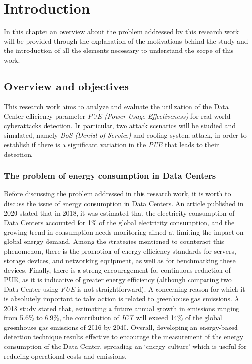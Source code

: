 \chapter{Introduction} \label{chapter:introduction}

\begin{citazione}
In this chapter an overview about the problem addressed by this research work will be provided through the explanation of the motivations behind the study and the introduction of all the elements necessary to understand the scope of this work.
\end{citazione}
\newpage


\section{Overview and objectives} 
This research work aims to analyze and evaluate the utilization of the Data Center efficiency parameter \emph{PUE (Power Usage Effectiveness)} for real world cyberattacks detection. In particular, two attack scenarios will be studied and simulated, namely \emph{DoS (Denial of Service)} and cooling system attack, in order to establish if there is a significant variation in the \emph{PUE} that leads to their detection. 

\subsection{The problem of energy consumption in Data Centers}
Before discussing the problem addressed in this research work, it is worth to discuss the issue of energy consumption in Data Centers. An article published in 2020 \cite{masanet2020recalibrating} stated that in 2018, it was estimated that the electricity consumption of Data Centers accounted for 1\% of the global electricity consumption, and the growing trend in consumption needs monitoring aimed at limiting the impact on global energy demand. Among the strategies mentioned to counteract this phenomenon, there is the promotion of energy efficiency standards for servers, storage devices, and networking equipment, as well as for benchmarking these devices. Finally, there is a strong encouragement for continuous reduction of PUE, as it is indicative of greater energy efficiency (although comparing two Data Center using \emph{PUE} is not straightforward). A concerning reason for which it is absolutely important to take action is related to greenhouse gas emissions. A 2018 study \cite{belkhir2018assessing} stated that, estimating a future annual growth in emissions ranging from 5.6\% to 6.9\%, the contribution of \emph{ICT} will exceed 14\% of the global greenhouse gas emissions of 2016 by 2040. Overall, developing an energy-based detection technique results effective to encourage the measurement of the energy consumption of the Data Center, spreading an `energy culture' which is useful for reducing operational costs and emissions.



